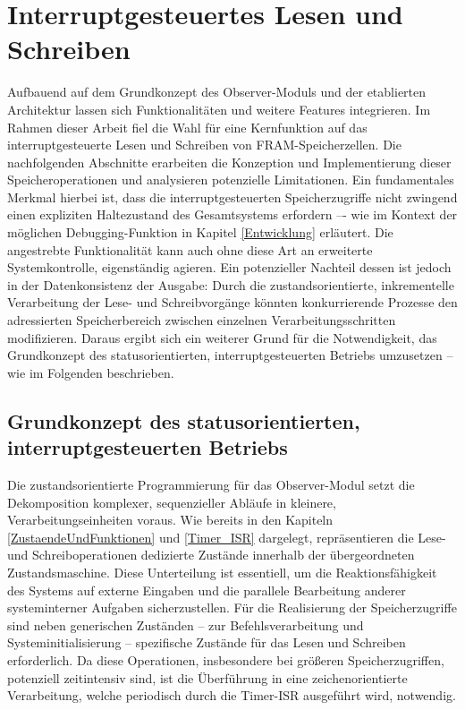 \newpage
\section{Interruptgesteuertes Lesen und Schreiben}
\label{Interruptgesteuertes_Lesen&Schreiben}

Aufbauend auf dem Grundkonzept des Observer-Moduls und der etablierten Architektur lassen sich Funktionalit\"aten und weitere Features integrieren. Im Rahmen dieser Arbeit fiel die Wahl f\"ur eine Kernfunktion auf das interruptgesteuerte Lesen und Schreiben von FRAM-Speicherzellen. Die nachfolgenden Abschnitte erarbeiten die Konzeption und Implementierung dieser Speicheroperationen und analysieren potenzielle Limitationen. Ein fundamentales Merkmal hierbei ist, dass die interruptgesteuerten Speicherzugriffe nicht zwingend einen expliziten Haltezustand des Gesamtsystems erfordern –- wie im Kontext der m\"oglichen Debugging-Funktion in Kapitel \ref{Entwicklung} erl\"autert. Die angestrebte Funktionalit\"at kann auch ohne diese Art an erweiterte Systemkontrolle, eigenst\"andig agieren. Ein potenzieller Nachteil dessen ist jedoch in der Datenkonsistenz der Ausgabe: Durch die zustandsorientierte, inkrementelle Verarbeitung der Lese- und Schreibvorg\"ange k\"onnten konkurrierende Prozesse den adressierten Speicherbereich zwischen einzelnen Verarbeitungsschritten modifizieren. Daraus ergibt sich ein weiterer Grund f\"ur die Notwendigkeit, das Grundkonzept des statusorientierten, interruptgesteuerten Betriebs umzusetzen – wie im Folgenden beschrieben.

\subsection{Grundkonzept des statusorientierten, interruptgesteuerten Betriebs}
\label{konzept_status_&_interrupt}

Die zustandsorientierte Programmierung f\"ur das Observer-Modul setzt die Dekomposition komplexer, sequenzieller Abl\"aufe in kleinere, Verarbeitungseinheiten voraus. Wie bereits in den Kapiteln \ref{ZustaendeUndFunktionen} und \ref{Timer_ISR} dargelegt, repr\"asentieren die Lese- und Schreiboperationen dedizierte Zust\"ande innerhalb der \"ubergeordneten Zustandsmaschine. Diese Unterteilung ist essentiell, um die Reaktionsf\"ahigkeit des Systems auf externe Eingaben und die parallele Bearbeitung anderer systeminterner Aufgaben sicherzustellen. F\"ur die Realisierung der Speicherzugriffe sind neben generischen Zust\"anden -- zur Befehlsverarbeitung und Systeminitialisierung -- spezifische Zust\"ande f\"ur das Lesen und Schreiben erforderlich. Da diese Operationen, insbesondere bei gr\"oßeren Speicherzugriffen, potenziell zeitintensiv sind, ist die \"Uberf\"uhrung in eine zeichenorientierte Verarbeitung, welche periodisch durch die Timer-ISR ausgef\"uhrt wird, notwendig.

